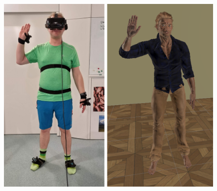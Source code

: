 \begin{figure}[H]
	\centering
	\includegraphics[width=\textwidth]{figures/selfPerception.png}	
	\caption[]{}
	\label{fig:selfPerception}
\end{figure}

